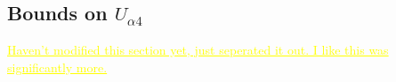 \documentclass[11pt, a4paper]{article}
\newcommand{\refref}[1]{Ref.~\cite{#1}}
\def\ster{\ensuremath N}
\newcommand{\newtext}[2]{\textcolor{#1}{\ul{#2}}}
\begin{document}
%
%
\subsection{Bounds on $U_{\alpha 4}$}

\newtext{MARK}{Haven't modified this section yet, just seperated it out. I like this was significantly more.}
\end{document}
